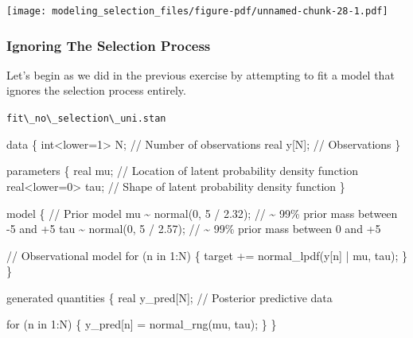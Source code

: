 \documentclass[
  letterpaper,
  DIV=11,
  numbers=noendperiod]{scrartcl}
\newenvironment{Shaded}{\begin{snugshade}}{\end{snugshade}}
\newcommand{\CommentTok}[1]{\textcolor[rgb]{0.37,0.37,0.37}{#1}}
\newcommand{\ControlFlowTok}[1]{\textcolor[rgb]{0.00,0.23,0.31}{#1}}
\newcommand{\DataTypeTok}[1]{\textcolor[rgb]{0.68,0.00,0.00}{#1}}
\newcommand{\DecValTok}[1]{\textcolor[rgb]{0.68,0.00,0.00}{#1}}
\newcommand{\FloatTok}[1]{\textcolor[rgb]{0.68,0.00,0.00}{#1}}
\newcommand{\KeywordTok}[1]{\textcolor[rgb]{0.00,0.23,0.31}{#1}}
\newcommand{\NormalTok}[1]{\textcolor[rgb]{0.00,0.23,0.31}{#1}}
\begin{document}
\texttt{[image: modeling\_selection\_files/figure-pdf/unnamed-chunk-28-1.pdf]}

\subsubsection{Ignoring The Selection
Process}\label{ignoring-the-selection-process-1}

Let's begin as we did in the previous exercise by attempting to fit a
model that ignores the selection process entirely.

\begin{codelisting}

\caption{\texttt{fit\textbackslash\_no\textbackslash\_selection\textbackslash\_uni.stan}}

\begin{Shaded}
\begin{Highlighting}[]
\KeywordTok{data}\NormalTok{ \{}
  \DataTypeTok{int}\NormalTok{\textless{}}\KeywordTok{lower}\NormalTok{=}\DecValTok{1}\NormalTok{\textgreater{} N; }\CommentTok{// Number of observations}
  \DataTypeTok{real}\NormalTok{ y[N];      }\CommentTok{// Observations}
\NormalTok{\}}

\KeywordTok{parameters}\NormalTok{ \{}
  \DataTypeTok{real}\NormalTok{ mu;           }\CommentTok{// Location of latent probability density function}
  \DataTypeTok{real}\NormalTok{\textless{}}\KeywordTok{lower}\NormalTok{=}\DecValTok{0}\NormalTok{\textgreater{} tau; }\CommentTok{// Shape of latent probability density function}
\NormalTok{\}}

\KeywordTok{model}\NormalTok{ \{}
  \CommentTok{// Prior model}
\NormalTok{  mu \textasciitilde{} normal(}\DecValTok{0}\NormalTok{, }\DecValTok{5}\NormalTok{ / }\FloatTok{2.32}\NormalTok{);   }\CommentTok{// \textasciitilde{} 99\% prior mass between {-}5 and +5}
\NormalTok{  tau \textasciitilde{} normal(}\DecValTok{0}\NormalTok{, }\DecValTok{5}\NormalTok{ / }\FloatTok{2.57}\NormalTok{);  }\CommentTok{// \textasciitilde{} 99\% prior mass between 0 and +5}
  
  \CommentTok{// Observational model}
  \ControlFlowTok{for}\NormalTok{ (n }\ControlFlowTok{in} \DecValTok{1}\NormalTok{:N) \{}
    \KeywordTok{target +=}\NormalTok{ normal\_lpdf(y[n] | mu, tau);}
\NormalTok{  \}}
\NormalTok{\}}

\KeywordTok{generated quantities}\NormalTok{ \{}
  \DataTypeTok{real}\NormalTok{ y\_pred[N]; }\CommentTok{// Posterior predictive data}

  \ControlFlowTok{for}\NormalTok{ (n }\ControlFlowTok{in} \DecValTok{1}\NormalTok{:N) \{}
\NormalTok{    y\_pred[n] = normal\_rng(mu, tau);}
\NormalTok{  \}}
\NormalTok{\}}
\end{Highlighting}
\end{Shaded}

\end{codelisting}
\end{document}

